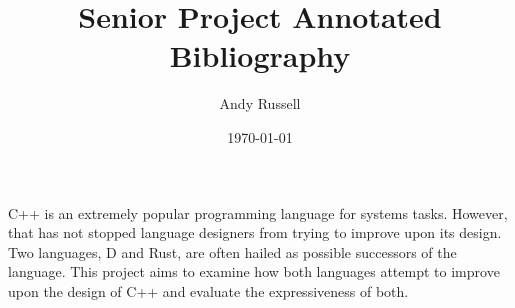 \documentclass[finalcopy,short]{srpaper}
\title{Senior Project Annotated Bibliography}
\author{Andy Russell}
\date{\today}
\begin{document}
\frontmatter

C++ is an extremely popular programming language for systems tasks. However,
that has not stopped language designers from trying to improve upon its
design. Two languages, D and Rust, are often hailed as possible successors of
the language. This project aims to examine how both languages attempt to
improve upon the design of C++ and evaluate the expressiveness of both.

\nocite{*}


\end{document}
